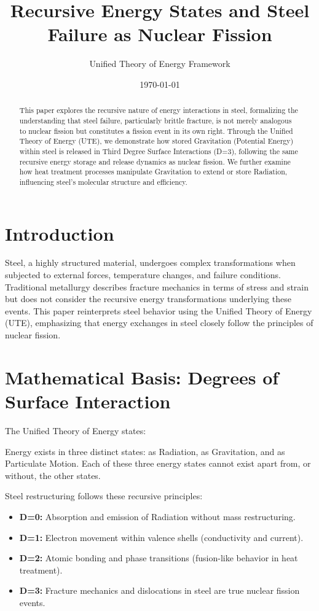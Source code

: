 \documentclass[letterpaper,12pt]{article}
\title{Recursive Energy States and Steel Failure as Nuclear Fission}
\author{Unified Theory of Energy Framework}
\date{\today}
\begin{document}
\maketitle

\begin{abstract}
This paper explores the recursive nature of energy interactions in steel, formalizing the understanding that steel failure, particularly brittle fracture, is not merely analogous to nuclear fission but constitutes a fission event in its own right. Through the Unified Theory of Energy (UTE), we demonstrate how stored Gravitation (Potential Energy) within steel is released in Third Degree Surface Interactions (D=3), following the same recursive energy storage and release dynamics as nuclear fission. We further examine how heat treatment processes manipulate Gravitation to extend or store Radiation, influencing steel's molecular structure and efficiency.
\end{abstract}

\section{Introduction}
Steel, a highly structured material, undergoes complex transformations when subjected to external forces, temperature changes, and failure conditions. Traditional metallurgy describes fracture mechanics in terms of stress and strain but does not consider the recursive energy transformations underlying these events. This paper reinterprets steel behavior using the Unified Theory of Energy (UTE), emphasizing that energy exchanges in steel closely follow the principles of nuclear fission.

\section{Mathematical Basis: Degrees of Surface Interaction}

The Unified Theory of Energy states:
\begin{theorem}
Energy exists in three distinct states: as Radiation, as Gravitation, and as Particulate Motion. Each of these three energy states cannot exist apart from, or without, the other states.
\end{theorem}

Steel restructuring follows these recursive principles:
\begin{itemize}
    \item \textbf{D=0:} Absorption and emission of Radiation without mass restructuring.
    \item \textbf{D=1:} Electron movement within valence shells (conductivity and current).
    \item \textbf{D=2:} Atomic bonding and phase transitions (fusion-like behavior in heat treatment).
    \item \textbf{D=3:} Fracture mechanics and dislocations in steel are true nuclear fission events.
\end{itemize}
\end{document}
